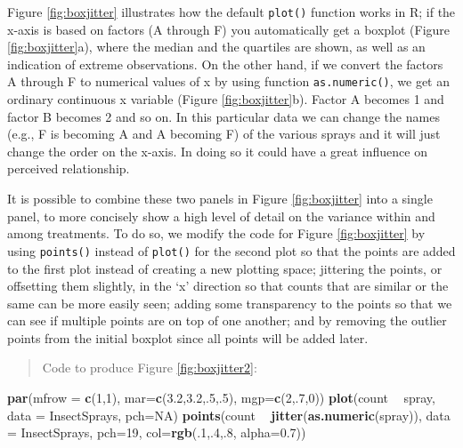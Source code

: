 \documentclass[letterpaper,]{book}
\newenvironment{Shaded}{\begin{snugshade}}{\end{snugshade}}
\newcommand{\DataTypeTok}[1]{\textcolor[rgb]{0.13,0.29,0.53}{#1}}
\newcommand{\DecValTok}[1]{\textcolor[rgb]{0.00,0.00,0.81}{#1}}
\newcommand{\FloatTok}[1]{\textcolor[rgb]{0.00,0.00,0.81}{#1}}
\newcommand{\KeywordTok}[1]{\textcolor[rgb]{0.13,0.29,0.53}{\textbf{#1}}}
\newcommand{\NormalTok}[1]{#1}
\newcommand{\OperatorTok}[1]{\textcolor[rgb]{0.81,0.36,0.00}{\textbf{#1}}}
\newcommand{\OtherTok}[1]{\textcolor[rgb]{0.56,0.35,0.01}{#1}}
\newcommand{\StringTok}[1]{\textcolor[rgb]{0.31,0.60,0.02}{#1}}
\begin{document}
Figure \ref{fig:boxjitter} illustrates how the default \texttt{plot()} function works in R; if the x-axis is based on factors (A through F) you automatically get a boxplot (Figure \ref{fig:boxjitter}a), where the median and the quartiles are shown, as well as an indication of extreme observations. On the other hand, if we convert the factors A through F to numerical values of x by using function \texttt{as.numeric()}, we get an ordinary continuous x variable (Figure \ref{fig:boxjitter}b). Factor A becomes 1 and factor B becomes 2 and so on. In this particular data we can change the names (e.g., F is becoming A and A becoming F) of the various sprays and it will just change the order on the x-axis. In doing so it could have a great influence on perceived relationship.

It is possible to combine these two panels in Figure \ref{fig:boxjitter} into a single panel, to more concisely show a high level of detail on the variance within and among treatments. To do so, we modify the code for Figure \ref{fig:boxjitter} by using \texttt{points()} instead of \texttt{plot()} for the second plot so that the points are added to the first plot instead of creating a new plotting space; jittering the points, or offsetting them slightly, in the `x' direction so that counts that are similar or the same can be more easily seen; adding some transparency to the points so that we can see if multiple points are on top of one another; and by removing the outlier points from the initial boxplot since all points will be added later.

\begin{quote}
Code to produce Figure \ref{fig:boxjitter2}:
\end{quote}

\begin{Shaded}
\begin{Highlighting}[]
\KeywordTok{par}\NormalTok{(}\DataTypeTok{mfrow =} \KeywordTok{c}\NormalTok{(}\DecValTok{1}\NormalTok{,}\DecValTok{1}\NormalTok{), }\DataTypeTok{mar=}\KeywordTok{c}\NormalTok{(}\FloatTok{3.2}\NormalTok{,}\FloatTok{3.2}\NormalTok{,.}\DecValTok{5}\NormalTok{,.}\DecValTok{5}\NormalTok{), }\DataTypeTok{mgp=}\KeywordTok{c}\NormalTok{(}\DecValTok{2}\NormalTok{,.}\DecValTok{7}\NormalTok{,}\DecValTok{0}\NormalTok{))}
\KeywordTok{plot}\NormalTok{(count }\OperatorTok{~}\StringTok{ }\NormalTok{spray, }\DataTypeTok{data =}\NormalTok{ InsectSprays, }\DataTypeTok{pch=}\OtherTok{NA}\NormalTok{)}
\KeywordTok{points}\NormalTok{(count }\OperatorTok{~}\StringTok{ }\KeywordTok{jitter}\NormalTok{(}\KeywordTok{as.numeric}\NormalTok{(spray)), }\DataTypeTok{data =}\NormalTok{ InsectSprays,}
       \DataTypeTok{pch=}\DecValTok{19}\NormalTok{, }\DataTypeTok{col=}\KeywordTok{rgb}\NormalTok{(.}\DecValTok{1}\NormalTok{,.}\DecValTok{4}\NormalTok{,.}\DecValTok{8}\NormalTok{, }\DataTypeTok{alpha=}\FloatTok{0.7}\NormalTok{))}
\end{Highlighting}
\end{Shaded}
\end{document}
